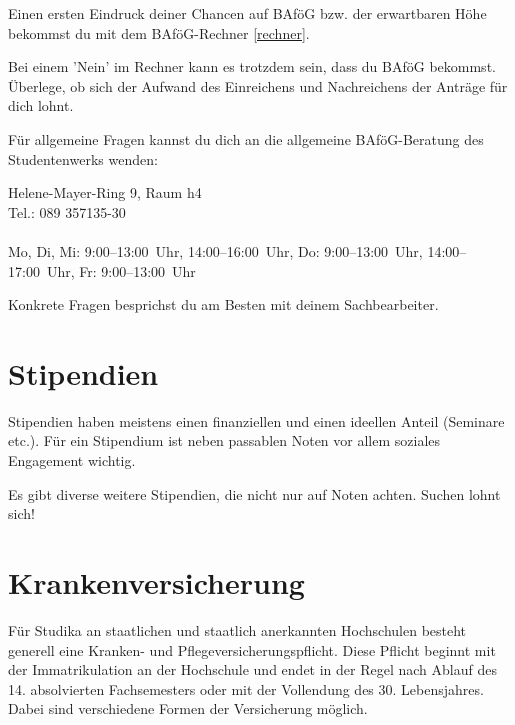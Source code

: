 Einen ersten Eindruck deiner Chancen auf BAföG bzw.  der erwartbaren
Höhe bekommst du mit dem BAföG-Rechner \ref{rechner}.

Bei einem 'Nein' im Rechner kann es trotzdem sein, dass du BAföG
bekommst. Überlege, ob sich der Aufwand des Einreichens und
Nachreichens der Anträge für dich lohnt.

Für allgemeine Fragen kannst du dich an die allgemeine BAföG-Beratung des Studentenwerks wenden:

Helene-Mayer-Ring 9, Raum h4\\
Tel.: 089 357135-30\\
\\
Mo, Di, Mi: 9:00--13:00~Uhr, 14:00--16:00~Uhr, Do: 9:00--13:00~Uhr, 14:00--17:00~Uhr, Fr: 9:00--13:00~Uhr

Konkrete Fragen besprichst du am Besten mit deinem Sachbearbeiter.

\begin{urlList}
\end{urlList}

\section{Stipendien}
Stipendien haben meistens einen finanziellen und einen ideellen Anteil
(Seminare etc.). Für ein Stipendium ist neben passablen Noten vor
allem soziales Engagement wichtig.

Es gibt diverse weitere Stipendien, die nicht nur auf Noten achten.
Suchen lohnt sich!

\begin{urlList}
\end{urlList}

\section{Krankenversicherung}

Für Studika an staatlichen und staatlich anerkannten Hochschulen
besteht generell eine Kranken- und Pflegeversicherungspflicht. Diese
Pflicht beginnt mit der Immatrikulation an der Hochschule und endet in
der Regel nach Ablauf des 14. absolvierten Fachsemesters oder mit der
Vollendung des 30. Lebensjahres. Dabei sind verschiedene Formen der
Versicherung möglich.

